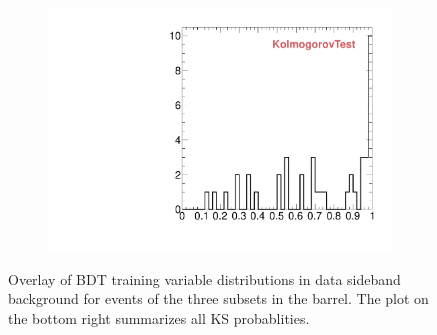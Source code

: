 \begin{figure}
\begin{subfigure}[b]{0.2\textwidth}
                \includegraphics[width=\textwidth]{Figures/VariablesComparison/Data_barrel_figs_3h/KS}
                \label{fig:Data_barrel_KS_3h}
        \end{subfigure}
        \caption{Overlay of BDT training variable distributions in data sideband background for events of the three subsets in the barrel. The plot on the bottom right summarizes all KS probablities.}
        \label{fig:Data_barrel_figs_3h}
\end{figure}


